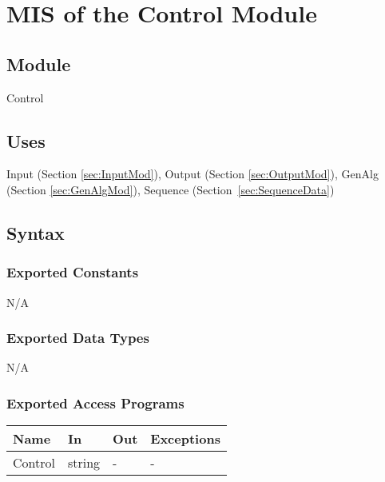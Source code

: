 \documentclass[12pt, titlepage]{article}
\begin{document}

\clearpage
\newpage
\section{MIS of the Control Module}

\subsection{Module}
Control

\subsection{Uses}

Input (Section \ref{sec:InputMod}), Output (Section \ref{sec:OutputMod}), 
GenAlg (Section \ref{sec:GenAlgMod}), Sequence (Section~\ref{sec:SequenceData})

\subsection{Syntax}

\subsubsection{Exported Constants}
N/A

\subsubsection{Exported Data Types}
N/A

\subsubsection{Exported Access Programs}

\begin{center}
\renewcommand*{\arraystretch}{1.5}
\begin{tabular} {p{}  p{}  p{} 
p{} } \hline 
\textbf{Name} & \textbf{In} & \textbf{Out} & \textbf{Exceptions} \\ \hline

  Control & string & - & - \\ \hline
\end{tabular}
\end{center}
\end{document}
